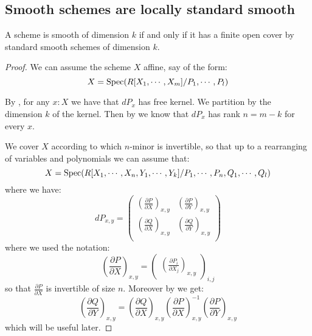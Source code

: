 \subsection{Smooth schemes are locally standard smooth}

\begin{proposition}\label{smooth-are-locally-standard}
A scheme is smooth of dimension $k$ if and only if it has a finite open cover by standard smooth schemes of dimension $k$.
\end{proposition}

\begin{proof}
We can assume the scheme $X$ affine, say of the form:
\[X = \operatorname{Spec}(R[X_1,\cdots,X_m]/P_1,\cdots,P_l)\]

By , for any $x:X$ we have that $dP_x$ has free kernel. We partition by the dimension $k$ of the kernel. Then by  we know that $dP_x$ has rank $n=m-k$ for every $x$.

We cover $X$ according to which $n$-minor is invertible, so that up to a rearranging of variables and polynomials we can assume that:
\[X = \operatorname{Spec}(R[X_1,\cdots,X_n,Y_1,\cdots,Y_k]/P_1,\cdots,P_n,Q_1,\cdots, Q_l)\]
where we have:
\[dP_{x,y} = \begin{pmatrix}
\left(\frac{\partial P}{\partial X}\right)_{x,y} & \left(\frac{\partial P}{\partial Y}\right)_{x,y} \\
\left(\frac{\partial Q}{\partial X}\right)_{x,y} & \left(\frac{\partial Q}{\partial Y}\right)_{x,y} \\
\end{pmatrix}\]
where we used the notation:
\[\left(\frac{\partial P}{\partial X}\right)_{x,y} = \begin{pmatrix}\left(\frac{\partial P_i}{\partial X_j}\right)_{x,y}\end{pmatrix}_{i,j}\]
so that $\frac{\partial P}{\partial X}$ is invertible of size $n$. Moreover by  we get:
\[\left(\frac{\partial Q}{\partial Y}\right)_{x,y} = \left(\frac{\partial Q}{\partial X}\right)_{x,y}\left(\frac{\partial P}{\partial X}\right)_{x,y}^{-1} \left(\frac{\partial P}{\partial Y}\right)_{x,y} \]
which will be useful later.


\end{proof}
